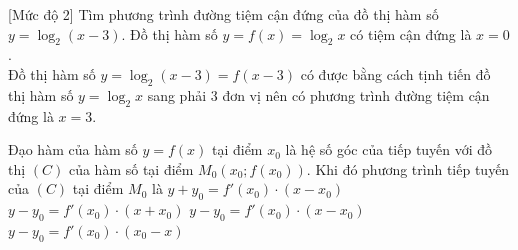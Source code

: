 \begin{bt}%
[Mức độ 2]%
Tìm phương trình đường tiệm cận đứng của đồ thị hàm số $y=\log_2 (x-3)$.
\loigiai
{Đồ thị hàm số $y=f(x)=\log_2 x$ có tiệm cận đứng là $x=0$.\\
Đồ thị hàm số $y=\log_2(x-3)=f(x-3)$ có được bằng cách tịnh tiến đồ thị hàm số $y=\log_2 x$ sang phải $3$ đơn vị nên có phương trình đường tiệm cận đứng là $x=3$.
}
\end{bt}

\begin{ex}%
	Đạo hàm của hàm số $y= f(x)$ tại điểm $x_0$ là hệ số góc của tiếp tuyến với đồ thị $(C)$ của hàm số tại điểm $M_0(x_0; f(x_0))$. Khi đó phương trình tiếp tuyến của $(C)$ tại điểm $M_0$  là
	\choice 
		{$y+y_0=f'(x_0)\cdot  (x-x_0)$}
		{$y-y_0=f'(x_0)\cdot  (x+x_0)$}
		{\True $y-y_0=f'(x_0)\cdot  (x-x_0)$}
		{$y-y_0=f'(x_0)\cdot  (x_0-x)$}
	\loigiai{ 
	 }
\end{ex}

